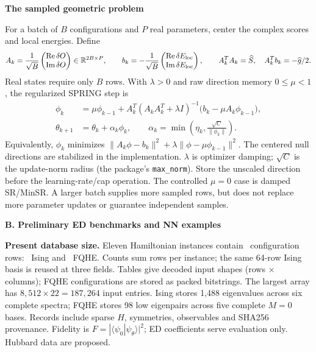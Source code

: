 \documentclass[10pt,letterpaper]{article}
\newcommand{\topic}[1]{\vspace{4pt}\textbf{\color{ink}#1}\par}
\newcommand{\R}{\mathbb R}
\begin{document}
\topic{The sampled geometric problem}
For a batch of $B$ configurations and $P$ real parameters, center the complex scores and local energies. Define
\begin{equation}
 A_k=\frac1{\sqrt B}\begin{pmatrix}\operatorname{Re}\delta O\\\operatorname{Im}\delta O\end{pmatrix}
 \in\R^{2B\times P},\qquad
 b_k=-\frac1{\sqrt B}\begin{pmatrix}\operatorname{Re}\delta E_{\rm loc}\\\operatorname{Im}\delta E_{\rm loc}\end{pmatrix},
 \qquad A_k^TA_k=\widehat S,\quad A_k^Tb_k=-\widehat g/2.
\end{equation}
Real states require only $B$ rows. With $\lambda>0$ and raw direction memory $0\leq\mu<1$, the regularized SPRING step is
\begin{align}
 \phi_k&=\mu\phi_{k-1}+A_k^T(A_kA_k^T+\lambda I)^{-1}
 \bigl(b_k-\mu A_k\phi_{k-1}\bigr),\\
 \theta_{k+1}&=\theta_k+\alpha_k\phi_k,\qquad
 \alpha_k=\min\!\left(\eta_k,\frac{\sqrt C}{\|\phi_k\|}\right).
\end{align}
Equivalently, $\phi_k$ minimizes $\|A_k\phi-b_k\|^2+\lambda\|\phi-\mu\phi_{k-1}\|^2$.
The centered null directions are stabilized in the implementation. $\lambda$ is optimizer damping; $\sqrt C$ is the update-norm radius (the package's \texttt{max\_norm}). Store the unscaled direction before the learning-rate/cap operation. The controlled $\mu=0$ case is damped SR/MinSR. A larger batch supplies more sampled rows, but does not replace more parameter updates or guarantee independent samples.

\clearpage
{}
\begin{center}{\Large\bfseries B. Preliminary ED benchmarks and NN examples}\end{center}
\textbf{Present database size.} Eleven Hamiltonian instances contain \TotalConfigRows\ configuration rows: \IsingConfigRows\ Ising and \FQHEConfigRows\ FQHE. Counts sum rows per instance; the same 64-row Ising basis is reused at three fields. Tables give decoded input shapes (rows $\times$ columns); FQHE configurations are stored as packed bitstrings. The largest array has $8,512\times22=187,264$ input entries. Ising stores 1,488 eigenvalues across six complete spectra; FQHE stores 98 low eigenpairs across five complete $M=0$ bases. Records include sparse $H$, symmetries, observables and SHA256 provenance. Fidelity is $F=|\langle\psi_0|\psi_\theta\rangle|^2$; ED coefficients serve evaluation only. Hubbard data are proposed.
\end{document}
